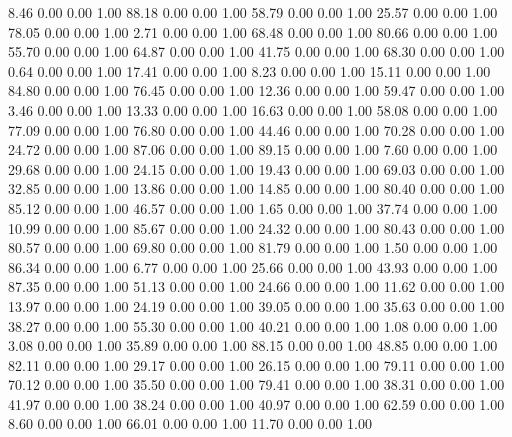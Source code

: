     8.46   0.00   0.00   1.00
   88.18   0.00   0.00   1.00
   58.79   0.00   0.00   1.00
   25.57   0.00   0.00   1.00
   78.05   0.00   0.00   1.00
    2.71   0.00   0.00   1.00
   68.48   0.00   0.00   1.00
   80.66   0.00   0.00   1.00
   55.70   0.00   0.00   1.00
   64.87   0.00   0.00   1.00
   41.75   0.00   0.00   1.00
   68.30   0.00   0.00   1.00
    0.64   0.00   0.00   1.00
   17.41   0.00   0.00   1.00
    8.23   0.00   0.00   1.00
   15.11   0.00   0.00   1.00
   84.80   0.00   0.00   1.00
   76.45   0.00   0.00   1.00
   12.36   0.00   0.00   1.00
   59.47   0.00   0.00   1.00
    3.46   0.00   0.00   1.00
   13.33   0.00   0.00   1.00
   16.63   0.00   0.00   1.00
   58.08   0.00   0.00   1.00
   77.09   0.00   0.00   1.00
   76.80   0.00   0.00   1.00
   44.46   0.00   0.00   1.00
   70.28   0.00   0.00   1.00
   24.72   0.00   0.00   1.00
   87.06   0.00   0.00   1.00
   89.15   0.00   0.00   1.00
    7.60   0.00   0.00   1.00
   29.68   0.00   0.00   1.00
   24.15   0.00   0.00   1.00
   19.43   0.00   0.00   1.00
   69.03   0.00   0.00   1.00
   32.85   0.00   0.00   1.00
   13.86   0.00   0.00   1.00
   14.85   0.00   0.00   1.00
   80.40   0.00   0.00   1.00
   85.12   0.00   0.00   1.00
   46.57   0.00   0.00   1.00
    1.65   0.00   0.00   1.00
   37.74   0.00   0.00   1.00
   10.99   0.00   0.00   1.00
   85.67   0.00   0.00   1.00
   24.32   0.00   0.00   1.00
   80.43   0.00   0.00   1.00
   80.57   0.00   0.00   1.00
   69.80   0.00   0.00   1.00
   81.79   0.00   0.00   1.00
    1.50   0.00   0.00   1.00
   86.34   0.00   0.00   1.00
    6.77   0.00   0.00   1.00
   25.66   0.00   0.00   1.00
   43.93   0.00   0.00   1.00
   87.35   0.00   0.00   1.00
   51.13   0.00   0.00   1.00
   24.66   0.00   0.00   1.00
   11.62   0.00   0.00   1.00
   13.97   0.00   0.00   1.00
   24.19   0.00   0.00   1.00
   39.05   0.00   0.00   1.00
   35.63   0.00   0.00   1.00
   38.27   0.00   0.00   1.00
   55.30   0.00   0.00   1.00
   40.21   0.00   0.00   1.00
    1.08   0.00   0.00   1.00
    3.08   0.00   0.00   1.00
   35.89   0.00   0.00   1.00
   88.15   0.00   0.00   1.00
   48.85   0.00   0.00   1.00
   82.11   0.00   0.00   1.00
   29.17   0.00   0.00   1.00
   26.15   0.00   0.00   1.00
   79.11   0.00   0.00   1.00
   70.12   0.00   0.00   1.00
   35.50   0.00   0.00   1.00
   79.41   0.00   0.00   1.00
   38.31   0.00   0.00   1.00
   41.97   0.00   0.00   1.00
   38.24   0.00   0.00   1.00
   40.97   0.00   0.00   1.00
   62.59   0.00   0.00   1.00
    8.60   0.00   0.00   1.00
   66.01   0.00   0.00   1.00
   11.70   0.00   0.00   1.00

